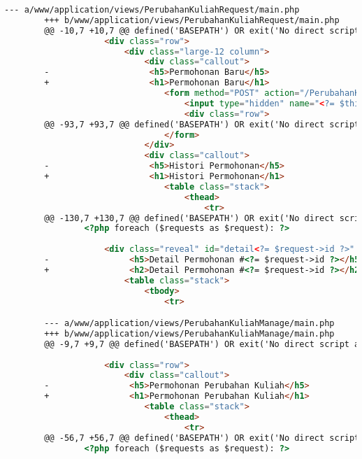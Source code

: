 \begin{itemize}
\begin{lstlisting}[frame=single, label={lst:perbaikan_1.3.1_tag_heading}, language=HTML, caption=Perbaikan Kriteria Sukses 1.3.1 - Penggunaan \textit{Heading} Tidak Tepat]
        --- a/www/application/views/PerubahanKuliahRequest/main.php
        +++ b/www/application/views/PerubahanKuliahRequest/main.php
        @@ -10,7 +10,7 @@ defined('BASEPATH') OR exit('No direct script access allowed');
                    <div class="row">
                        <div class="large-12 column">
                            <div class="callout">
        -                    <h5>Permohonan Baru</h5>
        +                    <h1>Permohonan Baru</h1>
                                <form method="POST" action="/PerubahanKuliahRequest/add">
                                    <input type="hidden" name="<?= $this->security->get_csrf_token_name() ?>" value="<?= $this->security->get_csrf_hash() ?>" />
                                    <div class="row">
        @@ -93,7 +93,7 @@ defined('BASEPATH') OR exit('No direct script access allowed');
                                </form>
                            </div>
                            <div class="callout">
        -                    <h5>Histori Permohonan</h5>
        +                    <h1>Histori Permohonan</h1>
                                <table class="stack">
                                    <thead>
                                        <tr>
        @@ -130,7 +130,7 @@ defined('BASEPATH') OR exit('No direct script access allowed');
                <?php foreach ($requests as $request): ?>
        
                    <div class="reveal" id="detail<?= $request->id ?>" data-reveal>
        -                <h5>Detail Permohonan #<?= $request->id ?></h5>
        +                <h2>Detail Permohonan #<?= $request->id ?></h2>
                        <table class="stack">
                            <tbody>
                                <tr>

        --- a/www/application/views/PerubahanKuliahManage/main.php
        +++ b/www/application/views/PerubahanKuliahManage/main.php
        @@ -9,7 +9,7 @@ defined('BASEPATH') OR exit('No direct script access allowed');
            
                    <div class="row">
                        <div class="callout">
        -                <h5>Permohonan Perubahan Kuliah</h5>
        +                <h1>Permohonan Perubahan Kuliah</h1>
                            <table class="stack">
                                <thead>
                                    <tr>
        @@ -56,7 +56,7 @@ defined('BASEPATH') OR exit('No direct script access allowed');
                <?php foreach ($requests as $request): ?>


\end{lstlisting}
\end{itemize}
